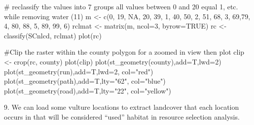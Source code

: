 \documentclass[
  letterpaper,
]{book}
\newenvironment{Shaded}{\begin{snugshade}}{\end{snugshade}}
\newcommand{\AttributeTok}[1]{\textcolor[rgb]{0.40,0.45,0.13}{#1}}
\newcommand{\CommentTok}[1]{\textcolor[rgb]{0.37,0.37,0.37}{#1}}
\newcommand{\ConstantTok}[1]{\textcolor[rgb]{0.56,0.35,0.01}{#1}}
\newcommand{\DecValTok}[1]{\textcolor[rgb]{0.68,0.00,0.00}{#1}}
\newcommand{\FunctionTok}[1]{\textcolor[rgb]{0.28,0.35,0.67}{#1}}
\newcommand{\NormalTok}[1]{\textcolor[rgb]{0.00,0.23,0.31}{#1}}
\newcommand{\OtherTok}[1]{\textcolor[rgb]{0.00,0.23,0.31}{#1}}
\newcommand{\StringTok}[1]{\textcolor[rgb]{0.13,0.47,0.30}{#1}}
\begin{document}
\begin{Shaded}
\begin{Highlighting}[]
\CommentTok{\# reclassify the values into 7 groups all values between 0 and 20 equal 1, etc. while removing water (11)}
\NormalTok{m }\OtherTok{\textless{}{-}} \FunctionTok{c}\NormalTok{(}\DecValTok{0}\NormalTok{, }\DecValTok{19}\NormalTok{, }\ConstantTok{NA}\NormalTok{, }\DecValTok{20}\NormalTok{, }\DecValTok{39}\NormalTok{, }\DecValTok{1}\NormalTok{, }\DecValTok{40}\NormalTok{, }\DecValTok{50}\NormalTok{, }\DecValTok{2}\NormalTok{, }\DecValTok{51}\NormalTok{, }\DecValTok{68}\NormalTok{, }\DecValTok{3}\NormalTok{, }\DecValTok{69}\NormalTok{,}\DecValTok{79}\NormalTok{, }\DecValTok{4}\NormalTok{, }\DecValTok{80}\NormalTok{, }\DecValTok{88}\NormalTok{, }\DecValTok{5}\NormalTok{, }\DecValTok{89}\NormalTok{, }\DecValTok{99}\NormalTok{, }\DecValTok{6}\NormalTok{)}
\NormalTok{rclmat }\OtherTok{\textless{}{-}} \FunctionTok{matrix}\NormalTok{(m, }\AttributeTok{ncol=}\DecValTok{3}\NormalTok{, }\AttributeTok{byrow=}\ConstantTok{TRUE}\NormalTok{)}
\NormalTok{rc }\OtherTok{\textless{}{-}} \FunctionTok{classify}\NormalTok{(SCnlcd, rclmat)}
\FunctionTok{plot}\NormalTok{(rc)}

\CommentTok{\#Clip the raster within the county polygon for a zoomed in view then plot}
\NormalTok{clip }\OtherTok{\textless{}{-}} \FunctionTok{crop}\NormalTok{(rc, county)}
\FunctionTok{plot}\NormalTok{(clip)}
\FunctionTok{plot}\NormalTok{(}\FunctionTok{st\_geometry}\NormalTok{(county),}\AttributeTok{add=}\NormalTok{T,}\AttributeTok{lwd=}\DecValTok{2}\NormalTok{)}
\FunctionTok{plot}\NormalTok{(}\FunctionTok{st\_geometry}\NormalTok{(run),}\AttributeTok{add=}\NormalTok{T,}\AttributeTok{lwd=}\DecValTok{2}\NormalTok{, }\AttributeTok{col=}\StringTok{"red"}\NormalTok{)}
\FunctionTok{plot}\NormalTok{(}\FunctionTok{st\_geometry}\NormalTok{(path),}\AttributeTok{add=}\NormalTok{T,}\AttributeTok{lty=}\StringTok{"62"}\NormalTok{, }\AttributeTok{col=}\StringTok{"blue"}\NormalTok{)}
\FunctionTok{plot}\NormalTok{(}\FunctionTok{st\_geometry}\NormalTok{(road),}\AttributeTok{add=}\NormalTok{T,}\AttributeTok{lty=}\StringTok{"22"}\NormalTok{, }\AttributeTok{col=}\StringTok{"yellow"}\NormalTok{)}
\end{Highlighting}
\end{Shaded}

9. We can load some vulture locations to extract landcover that each
location occurs in that will be considered ``used'' habitat in resource
selection analysis.
\end{document}
